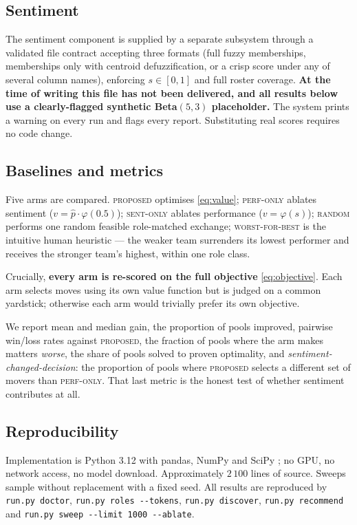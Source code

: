 \documentclass[conference]{IEEEtran}
\newcommand{\vv}{v}
\begin{document}
\subsection{Sentiment}
The sentiment component is supplied by a separate subsystem through a validated
file contract accepting three formats (full fuzzy memberships, memberships only
with centroid defuzzification, or a crisp score under any of several column
names), enforcing $s\in[0,1]$ and full roster coverage. \textbf{At the time of
writing this file has not been delivered, and all results below use a
clearly-flagged synthetic Beta$(5,3)$ placeholder.} The system prints a warning on
every run and flags every report. Substituting real scores requires no code
change.

\subsection{Baselines and metrics}
Five arms are compared. \textsc{proposed} optimises \eqref{eq:value};
\textsc{perf-only} ablates sentiment ($\vv=\widehat{p}\cdot\varphi(0.5)$);
\textsc{sent-only} ablates performance ($\vv=\varphi(s)$); \textsc{random}
performs one random feasible role-matched exchange; \textsc{worst-for-best} is
the intuitive human heuristic --- the weaker team surrenders its lowest performer
and receives the stronger team's highest, within one role class.

Crucially, \textbf{every arm is re-scored on the full objective}
\eqref{eq:objective}. Each arm selects moves using its own value function but is
judged on a common yardstick; otherwise each arm would trivially prefer its own
objective.

We report mean and median gain, the proportion of pools improved, pairwise
win/loss rates against \textsc{proposed}, the fraction of pools where the arm
makes matters \emph{worse}, the share of pools solved to proven optimality, and
\emph{sentiment-changed-decision}: the proportion of pools where
\textsc{proposed} selects a different set of movers than \textsc{perf-only}. That
last metric is the honest test of whether sentiment contributes at all.

\subsection{Reproducibility}\label{sec:repro}
Implementation is Python 3.12 with pandas, NumPy \cite{harris2020} and SciPy
\cite{virtanen2020}; no GPU, no network access, no model download. Approximately
$2\,100$ lines of source. Sweeps sample without replacement with a fixed seed.
All results are reproduced by
\texttt{run.py doctor}, \texttt{run.py roles -{}-tokens},
\texttt{run.py discover}, \texttt{run.py recommend} and
\texttt{run.py sweep -{}-limit 1000 -{}-ablate}.
\end{document}
